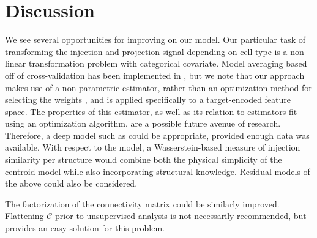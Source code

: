 \section{Discussion}

We see several opportunities for improving on our model.
Our particular task of transforming the injection and projection signal depending on cell-type is a non-linear transformation problem with categorical covariate.
Model averaging based off of cross-validation has been implemented in \citet{Gao2016-qe}, but we note that our approach makes use of a non-parametric estimator, rather than an optimization method for selecting the weights \citep{Saul2003-th}, and is applied specifically to a target-encoded feature space.
The properties of this estimator, as well as its relation to estimators fit using an optimization algorithm, are a possible future avenue of research.
Therefore, a deep model such as \citet{Lotfollahi2019-tr} could be appropriate, provided enough data was available.
With respect to the model, a Wasserstein-based measure of injection similarity per structure would combine both the physical simplicity of the centroid model while also incorporating structural knowledge.
Residual models of the above could also be considered.

The factorization of the connectivity matrix could be similarly improved.
Flattening $\mathcal C$ prior to unsupervised analysis is not necessarily recommended, but provides an easy solution for this problem.










% 


